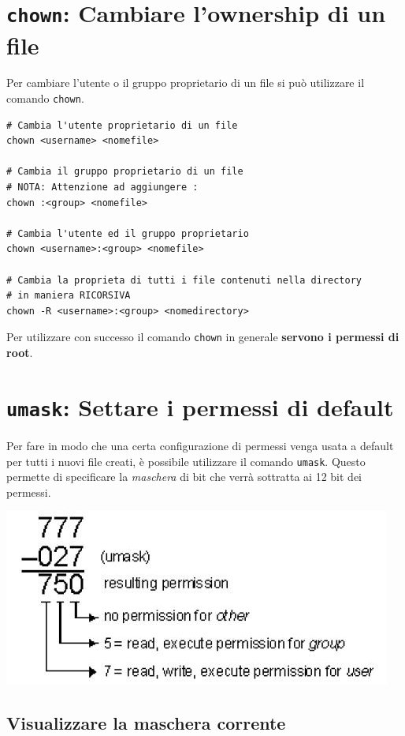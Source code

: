 \documentclass[a4paper]{report}
\newenvironment{ricordati}{\begin{tcolorbox}[fonttitle=\sffamily\bfseries\large,title=Ricordati,colframe=orange!75!white]}{\end{tcolorbox}}
\newenvironment{code}{\begin{tcolorbox}[size=small]}{\end{tcolorbox}}
\begin{document}
\section{\texttt{chown}: Cambiare l'ownership di un file}

Per cambiare l'utente o il gruppo proprietario di un file si può utilizzare il comando \texttt{chown}.

\begin{code} 
\begin{lstlisting}
# Cambia l'utente proprietario di un file
chown <username> <nomefile>

# Cambia il gruppo proprietario di un file
# NOTA: Attenzione ad aggiungere :
chown :<group> <nomefile>

# Cambia l'utente ed il gruppo proprietario
chown <username>:<group> <nomefile>

# Cambia la proprieta di tutti i file contenuti nella directory
# in maniera RICORSIVA
chown -R <username>:<group> <nomedirectory>
\end{lstlisting}
\end{code}

\begin{ricordati}
	Per utilizzare con successo il comando \texttt{chown} in generale \textbf{servono i permessi di root}.
\end{ricordati}

\section{\texttt{umask}: Settare i permessi di default}

Per fare in modo che una certa configurazione di permessi venga usata a default per tutti i nuovi file creati, è possibile utilizzare il comando \texttt{umask}. Questo permette di specificare la \textit{maschera} di bit che verrà sottratta ai 12 bit dei permessi.

\begin{center}
	\includegraphics[width=0.5\linewidth]{umask}
\end{center}

\subsection{Visualizzare la maschera corrente}
\end{document}
